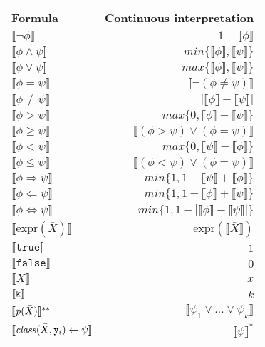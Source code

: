 
\centering
\begin{adjustbox}{width=\textwidth,totalheight=0.7\textheight,keepaspectratio}
    \begin{tabular}{l|r}
        \textbf{Formula} & \textbf{Continuous interpretation}
        \\
        \hline\hline
        $\llbracket\neg \phi\rrbracket$ & $1 - \llbracket\phi\rrbracket$
        \\
        $\llbracket\phi  \wedge \psi\rrbracket$ &  $min\{\llbracket\phi\rrbracket, \llbracket\psi\rrbracket\}$
        \\
        $\llbracket\phi  \vee \psi\rrbracket$ & $max\{\llbracket\phi\rrbracket, \llbracket\psi\rrbracket\}$
        \\
        $\llbracket\phi = \psi\rrbracket$ & $\llbracket\neg( \phi \ne \psi )\rrbracket $
        \\
        $\llbracket\phi \ne \psi\rrbracket$ & $|\llbracket\phi\rrbracket-\llbracket\psi\rrbracket|$ 
        \\
        $\llbracket\phi > \psi\rrbracket$  & $max\{0, \llbracket\phi\rrbracket - \llbracket\psi\rrbracket\}$
        \\
        $\llbracket\phi \ge \psi\rrbracket$ & $\llbracket( \phi > \psi ) \vee ( \phi = \psi )\rrbracket$ 
        \\
        $\llbracket\phi < \psi\rrbracket$  &  $max\{0, \llbracket\psi\rrbracket - \llbracket\phi\rrbracket\}$
        \\
        $\llbracket\phi \le \psi\rrbracket$  & $\llbracket( \phi < \psi ) \vee ( \phi = \psi )\rrbracket$
        \\
        $\llbracket\phi \Rightarrow \psi\rrbracket$ & $min\{1, 1- \llbracket\psi\rrbracket+\llbracket\phi\rrbracket\}$
         \\
        $\llbracket\phi \Leftarrow \psi\rrbracket$ & $min\{1, 1-\llbracket\phi\rrbracket+\llbracket\psi\rrbracket\}$ 
        \\
        $\llbracket\phi \Leftrightarrow \psi\rrbracket$ & $min\{1, 1-|\llbracket\phi\rrbracket-\llbracket\psi\rrbracket|\}$ 
        \\
        $\llbracket \text{expr}(\bar{X}) \rrbracket$ & $\text{expr}(\llbracket\bar{X}\rrbracket)$
        \\
        $\llbracket \mathtt{true} \rrbracket$ & $1$
        \\
        $\llbracket \mathtt{false} \rrbracket$ & $0$
        \\
        $\llbracket X \rrbracket$ & $x$
        \\
        $\llbracket \mathtt{k} \rrbracket$ & $k$
        \\
        $\llbracket \mathit{p}(\bar{X}) \rrbracket^{**}$ & $\llbracket \psi_1 \vee \ldots \vee \psi_k \rrbracket$
        \\
        $\llbracket \mathit{class}(\bar{X}, \mathtt{y}_i) \leftarrow \psi \rrbracket$ & $\llbracket \psi \rrbracket^{*}$
    \end{tabular}
\end{adjustbox}